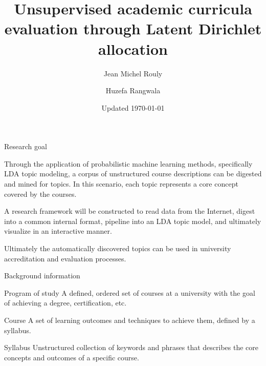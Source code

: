 \documentclass{beamer}
\title[Curricula and LDA]{Unsupervised academic curricula evaluation
  through Latent Dirichlet allocation}
\author{Jean Michel Rouly \and Huzefa Rangwala}
\date{Updated \today}
\begin{document}
  \frame{\titlepage}

  \begin{frame}{Research goal}

    \vfill

    Through the application of probabilistic machine learning methods,
    specifically LDA topic modeling, a corpus of unstructured course
    descriptions can be digested and mined for topics. In this scenario, each
    topic represents a core concept covered by the courses.

    \vfill

    A research framework will be constructed to read data from the
    Internet, digest into a common internal format, pipeline into an LDA
    topic model, and ultimately visualize in an interactive manner.

    \vfill

    Ultimately the automatically discovered topics can be used in
    university accreditation and evaluation processes.

    \vfill

  \end{frame}

  \begin{frame}{Background information}

    \onslide<+->
    \begin{block}{Program of study}
      A defined, ordered set of courses at a university with the goal of
      achieving a degree, certification, etc.
    \end{block}

    \onslide<+->
    \begin{block}{Course}
      A set of learning outcomes and techniques to achieve them, defined by
      a syllabus.
    \end{block}

    \onslide<+->
    \begin{block}{Syllabus}
      Unstructured collection of keywords and phrases that describes the
      core concepts and outcomes of a specific course.
    \end{block}

  \end{frame}
\end{document}
